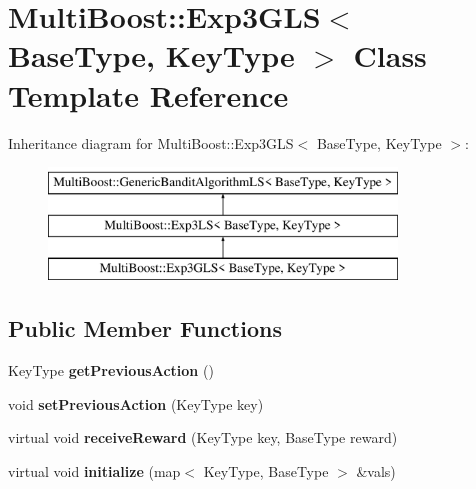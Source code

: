 \hypertarget{classMultiBoost_1_1Exp3GLS}{\section{Multi\-Boost\-:\-:Exp3\-G\-L\-S$<$ Base\-Type, Key\-Type $>$ Class Template Reference}
\label{classMultiBoost_1_1Exp3GLS}
}
Inheritance diagram for Multi\-Boost\-:\-:Exp3\-G\-L\-S$<$ Base\-Type, Key\-Type $>$\-:\begin{figure}[H]
\begin{center}
\leavevmode
\includegraphics[height=3.000000cm]{classMultiBoost_1_1Exp3GLS}
\end{center}
\end{figure}
\subsection*{Public Member Functions}
\begin{DoxyCompactItemize}
\item 
\hypertarget{classMultiBoost_1_1Exp3GLS_adc9cfcad4a49de23d77f5412cb2a2473}{Key\-Type {\bfseries get\-Previous\-Action} ()}\label{classMultiBoost_1_1Exp3GLS_adc9cfcad4a49de23d77f5412cb2a2473}

\item 
\hypertarget{classMultiBoost_1_1Exp3GLS_a03611a9051397e6134f01d78cf52c695}{void {\bfseries set\-Previous\-Action} (Key\-Type key)}\label{classMultiBoost_1_1Exp3GLS_a03611a9051397e6134f01d78cf52c695}

\item 
\hypertarget{classMultiBoost_1_1Exp3GLS_aa8229ee1d39c2de05c9b32f94d775b48}{virtual void {\bfseries receive\-Reward} (Key\-Type key, Base\-Type reward)}\label{classMultiBoost_1_1Exp3GLS_aa8229ee1d39c2de05c9b32f94d775b48}

\item 
\hypertarget{classMultiBoost_1_1Exp3GLS_ac09401422c11556470cb22a7109aa374}{virtual void {\bfseries initialize} (map$<$ Key\-Type, Base\-Type $>$ \&vals)}\label{classMultiBoost_1_1Exp3GLS_ac09401422c11556470cb22a7109aa374}

\end{DoxyCompactItemize}
